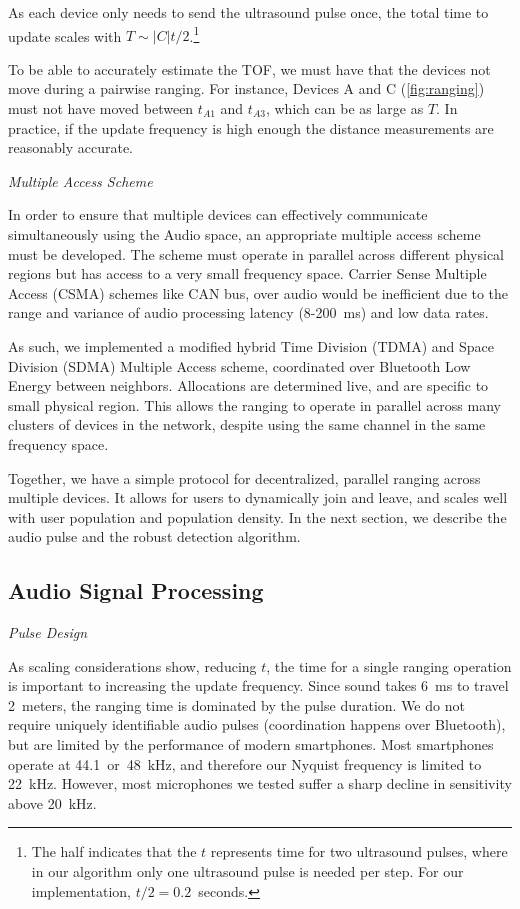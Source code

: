 \documentclass{article}
\begin{document}
As each device only needs to send the ultrasound pulse once, the total time to update scales with $T\sim|C|t/2$.\footnote{The half indicates that the $t$ represents time for two ultrasound pulses, where in our algorithm only one ultrasound pulse is needed per step. For our implementation, $t/2=0.2$~seconds.} 

To be able to accurately estimate the TOF, we must have that the devices not move during a pairwise ranging. For instance, Devices A and C (\cref{fig:ranging}) must not have moved between $t_{A1}$ and $t_{A3}$, which can be as large as $T$. In practice, if the update frequency is high enough the distance measurements are reasonably accurate.


\emph{Multiple Access Scheme}

In order to ensure that multiple devices can effectively communicate simultaneously using the Audio space, an appropriate multiple access scheme must be developed. The scheme must operate in parallel across different physical regions but has access to a very small frequency space. Carrier Sense Multiple Access (CSMA) schemes like CAN bus, over audio would be inefficient due to the range and variance of audio processing latency (8-200~ms) and low data rates.

As such, we implemented a modified hybrid Time Division (TDMA) and Space Division (SDMA) Multiple Access scheme, coordinated over Bluetooth Low Energy between neighbors. Allocations are determined live, and are specific to small physical region. This allows the ranging to operate in parallel across many clusters of devices in the network, despite using the same channel in the same frequency space.

Together, we have a simple protocol for decentralized, parallel ranging across multiple devices. It allows for users to dynamically join and leave, and scales well with user population and population density. In the next section, we describe the audio pulse and the robust detection algorithm.

\subsection{Audio Signal Processing}

\emph{Pulse Design}

As scaling considerations show, reducing $t$, the time for a single ranging operation is important to increasing the update frequency. Since sound takes 6~ms to travel 2~meters, the ranging time is dominated by the pulse duration. We do not require uniquely identifiable audio pulses (coordination happens over Bluetooth), but are limited by the performance of modern smartphones. Most smartphones operate at 44.1~or~48~kHz, and therefore our Nyquist frequency is limited to 22~kHz. However, most microphones we tested suffer a sharp decline in sensitivity above 20~kHz. 
\end{document}
